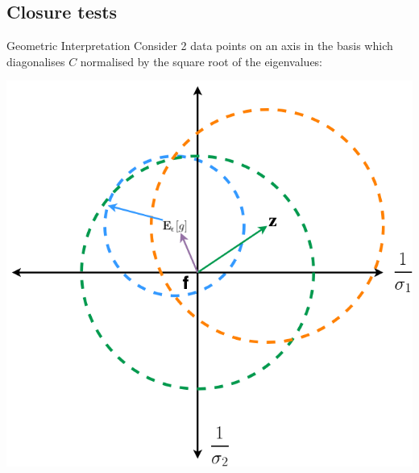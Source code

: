 \subsection{Closure tests}
\begin{frame}{Geometric Interpretation}
    \Fontvi
    Consider 2 data points on an axis in the basis which diagonalises $C$ normalised by the square root of the eigenvalues:

    \begin{center}
        \includegraphics[scale=0.3]{closure_test/testdiaggram.png}
    \end{center}
\end{frame}
